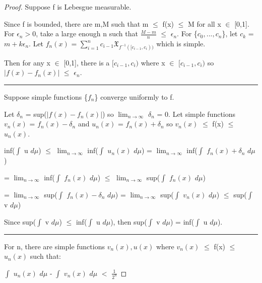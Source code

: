     \begin{proof}
        Suppose f is Lebesgue measurable.

        Since f is bounded, there are m,M such that m $\leq$ f(x) $\leq$ M
        for all x $\in$ [0,1]. For $\epsilon_n > 0$, take a large enough n
        such that $\frac{M-m}{n}$ $\leq$ $\epsilon_n$.
        For \{$c_0,...,c_n$\}, let $c_k$ = $m + k\epsilon_n$.
        Let $f_n(x)$ = $\sum_{i=1}^n c_{i-1}\mathfrak{X}_{f^{-1}([c_{i-1},c_i))}$
        which is simple.

        Then for any x $\in$ [0,1], there is a $[c_{i-1},c_i)$
        where x $\in$ $[c_{i-1},c_i)$ so
        $|f(x) - f_n(x)|$ $\leq$ $\epsilon_n$.

        \rule[0.1cm]{15.2cm}{0.01cm}

        Suppose simple functions \{$f_n$\} converge uniformly to f.

        Let $\delta_n$ = sup($|f(x) - f_n(x)|$) so
        $\lim_{n \rightarrow \infty}$ $\delta_n$ = 0.
        Let simple functions $v_n(x)$ = $f_n(x) - \delta_n$
        and $u_n(x)$ = $f_n(x) + \delta_n$
        so $v_n(x)$ $\leq$ f(x) $\leq$ $u_n(x)$.

        \hspace{0.5cm}
        inf($\int$ u $d\mu$)
        $\leq$ $\lim_{n \rightarrow \infty}$ inf($\int$ $u_n(x)$ $d\mu$)
        = $\lim_{n \rightarrow \infty}$ inf($\int$ $f_n(x) + \delta_n$ $d\mu$)

        \hspace{0.5cm}
        = $\lim_{n \rightarrow \infty}$ inf($\int$ $f_n(x)$ $d\mu$)
        $\leq$ $\lim_{n \rightarrow \infty}$ sup($\int$ $f_n(x)$ $d\mu$)

        \hspace{0.5cm}
        = $\lim_{n \rightarrow \infty}$ sup($\int$ $f_n(x) - \delta_n$ $d\mu$)
        = $\lim_{n \rightarrow \infty}$ sup($\int$ $v_n(x)$ $d\mu$)
        $\leq$ sup($\int$ v $d\mu$)

        Since sup($\int$ v $d\mu$) $\leq$ inf($\int$ u $d\mu$),
        then sup($\int$ v $d\mu$) = inf($\int$ u $d\mu$).

        \rule[0.1cm]{15.2cm}{0.01cm}

        For n, there are simple functions $v_n(x),u(x)$
        where $v_n(x)$ $\leq$ f(x) $\leq$ $u_n(x)$ such that:
        
        \hspace{0.5cm}
        $\int$ $u_n(x)$ $d\mu$ - $\int$ $v_n(x)$ $d\mu$ $<$ $\frac{1}{2^n}$


\end{proof}
